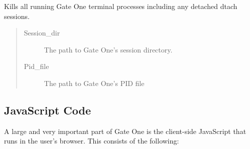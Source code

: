 \documentclass[letterpaper,10pt,openany]{sphinxmanual}
\begin{document}
\begin{fulllineitems}
\label{Developer/utils:gateone.core.utils.killall}
Kills all running Gate One terminal processes including any detached dtach
sessions.
\begin{quote}\begin{description}
\item[{Session\_dir}] \leavevmode
The path to Gate One's session directory.

\item[{Pid\_file}] \leavevmode
The path to Gate One's PID file

\end{description}\end{quote}

\end{fulllineitems}



\subsection{JavaScript Code}
\label{Developer/index:javascript-code}
A large and very important part of Gate One is the client-side JavaScript that runs in the user's browser.  This consists of the following:
\end{document}
